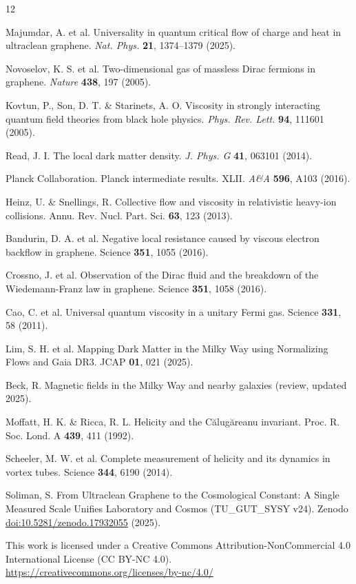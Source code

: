 \documentclass[11pt,a4paper]{article}
\begin{document}

\begin{thebibliography}{12}

Majumdar, A. et al. Universality in quantum critical flow of charge and heat in ultraclean graphene. \textit{Nat. Phys.} \textbf{21}, 1374--1379 (2025).

Novoselov, K. S. et al. Two-dimensional gas of massless Dirac fermions in graphene. \textit{Nature} \textbf{438}, 197 (2005).

Kovtun, P., Son, D. T. \& Starinets, A. O. Viscosity in strongly interacting quantum field theories from black hole physics. \textit{Phys. Rev. Lett.} \textbf{94}, 111601 (2005).

Read, J. I. The local dark matter density. \textit{J. Phys. G} \textbf{41}, 063101 (2014).

Planck Collaboration. Planck intermediate results. XLII. \textit{A\&A} \textbf{596}, A103 (2016).

Heinz, U. \& Snellings, R. Collective flow and viscosity in relativistic heavy-ion collisions. Annu. Rev. Nucl. Part. Sci. \textbf{63}, 123 (2013).

Bandurin, D. A. et al. Negative local resistance caused by viscous electron backflow in graphene. Science \textbf{351}, 1055 (2016).

Crossno, J. et al. Observation of the Dirac fluid and the breakdown of the Wiedemann-Franz law in graphene. Science \textbf{351}, 1058 (2016).

Cao, C. et al. Universal quantum viscosity in a unitary Fermi gas. Science \textbf{331}, 58 (2011).

Lim, S. H. et al. Mapping Dark Matter in the Milky Way using Normalizing Flows and Gaia DR3. JCAP \textbf{01}, 021 (2025).

Beck, R. Magnetic fields in the Milky Way and nearby galaxies (review, updated 2025).

Moffatt, H. K. \& Ricca, R. L. Helicity and the Călugăreanu invariant. Proc. R. Soc. Lond. A \textbf{439}, 411 (1992).

Scheeler, M. W. et al. Complete measurement of helicity and its dynamics in vortex tubes. Science \textbf{344}, 6190 (2014).

Soliman, S. From Ultraclean Graphene to the Cosmological Constant: A Single Measured Scale Unifies Laboratory and Cosmos (TU\_GUT\_SYSY v24). Zenodo \href{https://doi.org/10.5281/zenodo.17932055}{doi:10.5281/zenodo.17932055} (2025).

\end{thebibliography}

\clearpage
\vspace*{2cm}
{\centering
This work is licensed under a Creative Commons Attribution-NonCommercial 4.0 International License (CC BY-NC 4.0).\\
\url{https://creativecommons.org/licenses/by-nc/4.0/}\\
}
\end{document}
